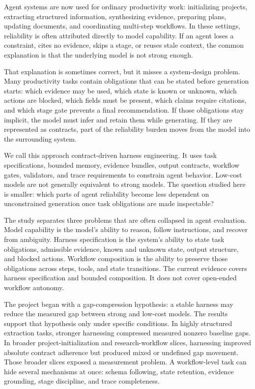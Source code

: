 \documentclass[11pt]{article}
\begin{document}
Agent systems are now used for ordinary productivity work: initializing projects, extracting structured information, synthesizing evidence, preparing plans, updating documents, and coordinating multi-step workflows. In these settings, reliability is often attributed directly to model capability. If an agent loses a constraint, cites no evidence, skips a stage, or reuses stale context, the common explanation is that the underlying model is not strong enough.

That explanation is sometimes correct, but it misses a system-design problem. Many productivity tasks contain obligations that can be stated before generation starts: which evidence may be used, which state is known or unknown, which actions are blocked, which fields must be present, which claims require citations, and which stage gate prevents a final recommendation. If those obligations stay implicit, the model must infer and retain them while generating. If they are represented as contracts, part of the reliability burden moves from the model into the surrounding system.

We call this approach contract-driven harness engineering. It uses task specifications, bounded memory, evidence bundles, output contracts, workflow gates, validators, and trace requirements to constrain agent behavior. Low-cost models are not generally equivalent to strong models. The question studied here is smaller: which parts of agent reliability become less dependent on unconstrained generation once task obligations are made inspectable?

The study separates three problems that are often collapsed in agent evaluation. Model capability is the model's ability to reason, follow instructions, and recover from ambiguity. Harness specification is the system's ability to state task obligations, admissible evidence, known and unknown state, output structure, and blocked actions. Workflow composition is the ability to preserve those obligations across steps, tools, and state transitions. The current evidence covers harness specification and bounded composition. It does not cover open-ended workflow autonomy.

The project began with a gap-compression hypothesis: a stable harness may reduce the measured gap between strong and low-cost models. The results support that hypothesis only under specific conditions. In highly structured extraction tasks, stronger harnessing compressed measured nonzero baseline gaps. In broader project-initialization and research-workflow slices, harnessing improved absolute contract adherence but produced mixed or undefined gap movement. Those broader slices exposed a measurement problem. A workflow-level task can hide several mechanisms at once: schema following, state retention, evidence grounding, stage discipline, and trace completeness.
\end{document}

